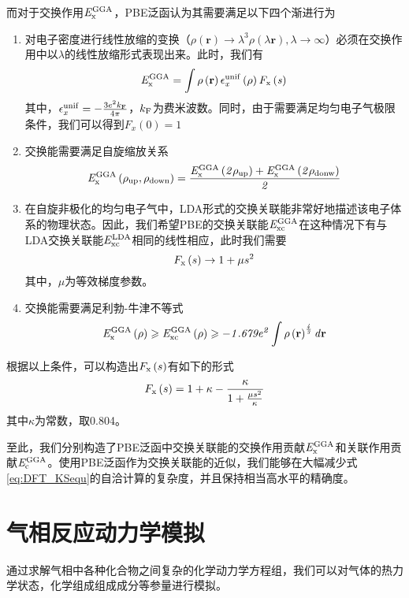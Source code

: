 而对于交换作用$\it E_{\rm x}^{\rm GGA} \it$，PBE泛函认为其需要满足以下四个渐进行为\chinesecolon
\begin{enumerate}[labelsep=0em,label=（\arabic*）,wide]
    \item 对电子密度进行线性放缩的变换（$\rho\left({\bm r}\right)\rightarrow \lambda^3\rho(\lambda {\bm r}), \lambda\rightarrow \infty$）必须在交换作用中以$\lambda$的线性放缩形式表现出来。此时，我们有\chinesecolon
    \[
        \it E_{\rm x}^{\rm GGA} \it=\int\rho\left({\mathbf r}\right)\epsilon_x^{\rm unif}\left(\rho\right)F_{\rm x}\left(s\right)
    \]
    其中，$\epsilon_x^{\rm unif}=-\frac{3e^2k_{\rm F}}{4\pi}$，$k_{\rm F}$为费米波数。同时，由于需要满足均匀电子气极限条件，我们可以得到$F_{x}\left(0\right)=1$
    \item 交换能需要满足自旋缩放关系\chinesecolon
    \[
        \it E_{\rm x}^{\rm GGA} \it\left(\rho_{\rm up},\rho_{\rm down}\right)=\frac{\it E_{\rm x}^{\rm GGA} \it\left(2\rho_{\rm up}\right)+\it E_{\rm x}^{\rm GGA} \it\left(2\rho_{\rm donw}\right)}{2}
    \]
    \item 在自旋非极化的均匀电子气中，LDA形式的交换关联能非常好地描述该电子体系的物理状态。因此，我们希望PBE的交换关联能$\it E_{\rm xc}^{\rm GGA} \it$在这种情况下有与LDA交换关联能$\it E_{\rm xc}^{\rm LDA} \it$相同的线性相应，此时我们需要\chinesecolon
    \[
        F_{\rm x}\left(s\right)\rightarrow 1+\mu s^2
    \]
    其中，$\mu$为等效梯度参数。
    \item 交换能需要满足利勃-牛津不等式\chinesecolon
    \[
        \it E_{\rm x}^{\rm GGA} \it\left(\rho\right)\geqslant\it E_{\rm xc}^{\rm GGA} \it\left(\rho\right)\geqslant -1.679e^2\int \rho\left({\mathbf r}\right)^{\frac{4}{3}} d{\mathbf r}
    \]
\end{enumerate}

根据以上条件，可以构造出$F_{\rm x}\left(s\right)$有如下的形式\chinesecolon
\begin{equation}
    F_{\rm x}\left(s\right)=1+\kappa -\frac{\kappa }{1+\frac{\mu s^2}{\kappa}}
\end{equation}
其中$\kappa$为常数，取0.804。

至此，我们分别构造了PBE泛函中交换关联能的交换作用贡献$\it E_{\rm x}^{\rm GGA} \it$和关联作用贡献$\it E_{\rm c}^{\rm GGA} \it$。使用PBE泛函作为交换关联能的近似，我们能够在大幅减少式\ref{eq:DFT_KSequ}的自洽计算的复杂度，并且保持相当高水平的精确度。
\section{气相反应动力学模拟}
通过求解气相中各种化合物之间复杂的化学动力学方程组，我们可以对气体的热力学状态，化学组成组成成分等参量进行模拟。

